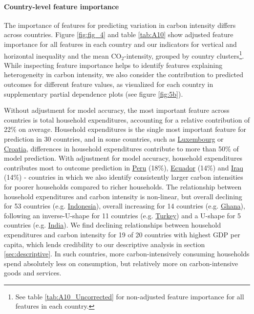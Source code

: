 \documentclass[12pt, a4paper]{article}
\begin{document}
\paragraph{Country-level feature importance}
The importance of features for predicting variation in carbon intensity differs across countries. Figure \ref{fig:fig_4} and table \ref{tab:A10} show adjusted feature importance for all features in each country and our indicators for vertical and horizontal inequality and the mean CO$_{2}$-intensity, grouped by country clusters\footnote{See table \ref{tab:A10_Uncorrected} for non-adjusted feature importance for all features in each country.}. While inspecting feature importance helps to identify features explaining heterogeneity in carbon intensity, we also consider the contribution to predicted outcomes for different feature values, as visualized for each country in supplementary partial dependence plots (see figure \ref{fig:5b}).

Without adjustment for model accuracy, the most important feature across countries is total household expenditures, accounting for a relative contribution of 22\% on average. Household expenditures is the single most important feature for prediction in 30 countries, and in some countries, such as \hyperref[fig:5b_LUX]{Luxembourg} or \hyperref[fig:5b_HRV]{Croatia}, differences in household expenditures contribute to more than 50\% of model prediction. With adjustment for model accuracy, household expenditures contributes most to outcome prediction in \hyperref[fig:5b_PER]{Peru} (18\%), \hyperref[fig:5b_ECU]{Ecuador} (14\%) and \hyperref[fig:5b_IRQ]{Iraq} (14\%) - countries in which we also identify consistently larger carbon intensities for poorer households compared to richer households. The relationship between household expenditures and carbon intensity is non-linear, but overall declining for 53 countries (e.g. \hyperref[fig:5b_EST]{Indonesia}), overall increasing for 14 countries (e.g. \hyperref[fig:5b_GHA]{Ghana}), following an inverse-U-shape for 11 countries (e.g. \hyperref[fig:5b_TUR]{Turkey}) and a U-shape for 5 countries (e.g. \hyperref[fig:5b_IND]{India}). We find declining relationships between household expenditures and carbon intensity for 19 of 20 countries with highest GDP per capita, which lends credibility to our descriptive analysis in section \ref{sec:descriptive}. In such countries, more carbon-intensively consuming households spend absolutely less on consumption, but relatively more on carbon-intensive goods and services.
\end{document}
